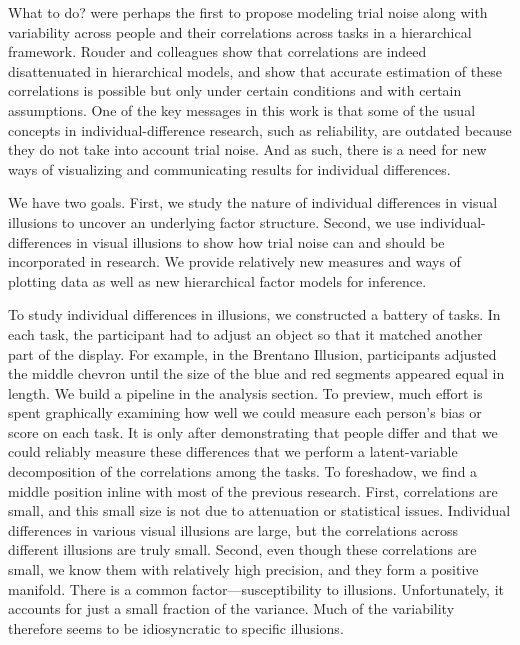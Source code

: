 What to do? \textcite{Matzke.etal.2017} were perhaps the first to propose modeling trial noise along with variability across people and their correlations across tasks in a hierarchical framework.  Rouder and colleagues \parencite[]{Rouder.Haaf.2019, Rouder.etal.2023, Rouder.Mehrvarz.2024} show that correlations are indeed disattenuated in hierarchical models, and \textcite{Mehrvarz.Rouder.2025} show that accurate estimation of these correlations is possible but only under certain conditions and with certain assumptions.  One of the key messages in this work is that some of the usual concepts in individual-difference research, such as reliability, are outdated because they do not take into account trial noise.  And as such, there is a need for new ways of visualizing and communicating results for individual differences.  


We have two goals.  First, we study the nature of individual differences in visual illusions to uncover an underlying factor structure.  Second, we use individual-differences in visual illusions to show how trial noise can and should be incorporated in research.  We provide relatively new measures and ways of plotting data as well as new hierarchical factor models for inference.  


To study individual differences in illusions, we constructed a battery of tasks. In each task, the participant had to adjust an object so that it matched another part of the display.  For example, in the Brentano Illusion, participants adjusted the middle chevron until the size of the blue and red segments appeared equal in length.  We build a pipeline in the analysis section.  To preview, much effort is spent graphically examining how well we could measure each person's bias or score on each task.  It is only after demonstrating that people differ and that we could reliably measure these differences that we perform a latent-variable decomposition of the correlations among the tasks.  To foreshadow, we find a middle position inline with most of the previous research.  First, correlations are small, and this small size is not due to attenuation or statistical issues.  Individual differences in various visual illusions are large, but the correlations across different illusions are truly small.  Second, even though these correlations are small, we know them with relatively high precision, and they form a positive manifold. There is a common factor---susceptibility to illusions.  Unfortunately, it accounts for just a small fraction of the variance.  Much of the variability therefore seems to be idiosyncratic to specific illusions.

